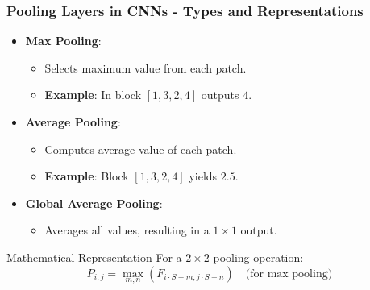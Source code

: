 \documentclass{beamer}
\begin{document}
\begin{frame}[fragile]
    \frametitle{Pooling Layers in CNNs - Types and Representations}
    \begin{itemize}
        \item \textbf{Max Pooling}:
            \begin{itemize}
                \item Selects maximum value from each patch.
                \item \textbf{Example}: In block \([1, 3, 2, 4]\) outputs \(4\).
            \end{itemize}
        \item \textbf{Average Pooling}:
            \begin{itemize}
                \item Computes average value of each patch.
                \item \textbf{Example}: Block \([1, 3, 2, 4]\) yields \(2.5\).
            \end{itemize}
        \item \textbf{Global Average Pooling}:
            \begin{itemize}
                \item Averages all values, resulting in a \(1\times1\) output.
            \end{itemize}
    \end{itemize}
    
    \begin{block}{Mathematical Representation}
        For a \(2 \times 2\) pooling operation:
        \[
        P_{i,j} = \max_{m,n}(F_{i \cdot S + m,j \cdot S + n}) \quad \text{(for max pooling)}
        \]
    \end{block}
\end{frame}
\end{document}
